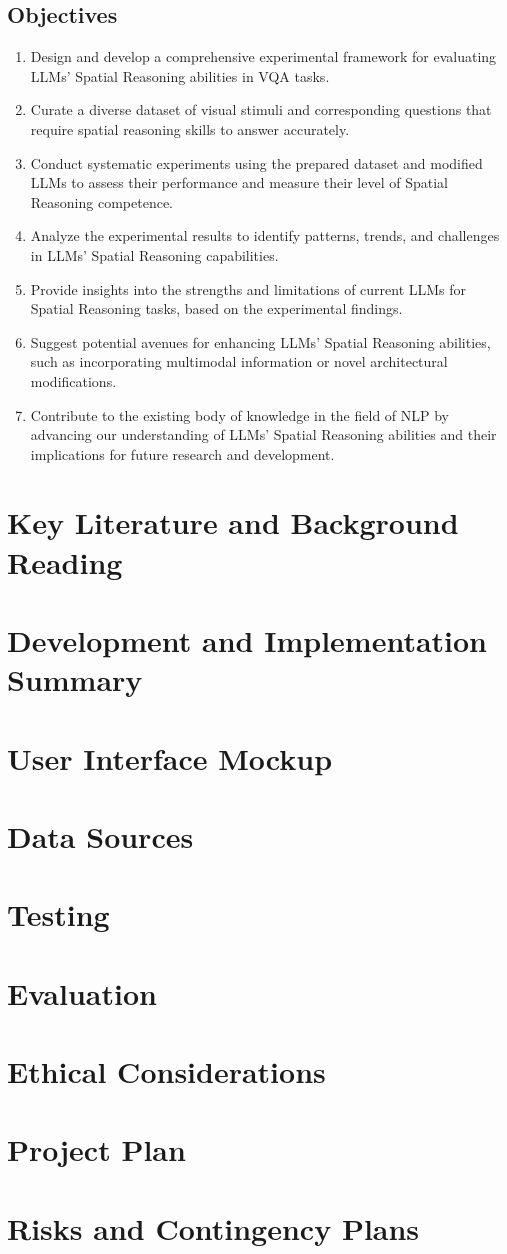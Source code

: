 \documentclass[journal,10pt]{IEEEtran}
\begin{document}
\subsection{Objectives}
\begin{enumerate}
    \item Design and develop a comprehensive experimental framework for evaluating LLMs' Spatial Reasoning abilities in VQA tasks.
    \item Curate a diverse dataset of visual stimuli and corresponding questions that require spatial reasoning skills to answer accurately.
    \item Conduct systematic experiments using the prepared dataset and modified LLMs to assess their performance and measure their level of Spatial Reasoning competence.
    \item Analyze the experimental results to identify patterns, trends, and challenges in LLMs' Spatial Reasoning capabilities.
    \item Provide insights into the strengths and limitations of current LLMs for Spatial Reasoning tasks, based on the experimental findings.
    \item Suggest potential avenues for enhancing LLMs' Spatial Reasoning abilities, such as incorporating multimodal information or novel architectural modifications.
    \item Contribute to the existing body of knowledge in the field of NLP by advancing our understanding of LLMs' Spatial Reasoning abilities and their implications for future research and development.
\end{enumerate}

\section{Key Literature and Background Reading}


\section{Development and Implementation Summary}
\section{User Interface Mockup}
\section{Data Sources}
\section{Testing}
\section{Evaluation}
\section{Ethical Considerations}
\section{Project Plan}
\section{Risks and Contingency Plans}



\end{document}
